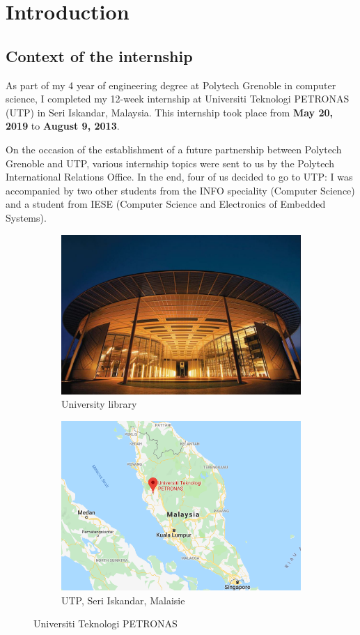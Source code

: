 \chapter{Introduction}

\section{Context of the internship}

As part of my 4 year of engineering degree at Polytech Grenoble in computer science, I completed my 12-week internship at Universiti Teknologi PETRONAS (UTP) in Seri Iskandar, Malaysia. This internship took place from \textbf{May 20, 2019} to \textbf{August 9, 2013}.

On the occasion of the establishment of a future partnership between Polytech Grenoble and UTP, various internship topics were sent to us by the Polytech International Relations Office. In the end, four of us decided to go to UTP: I was accompanied by two other students from the INFO speciality (Computer Science) and a student from IESE (Computer Science and Electronics of Embedded Systems).


\begin{figure}[h]
  \centering
  \begin{subfigure}{.5\textwidth}
    \centering
    \includegraphics[width=.8\linewidth]{content/imgs/utp.jpg}
    \caption{University library}
  \end{subfigure}%
  \begin{subfigure}{.5\textwidth}
    \centering
    \includegraphics[width=.8\linewidth]{content/imgs/map.png}
    \caption{UTP, Seri Iskandar, Malaisie}
  \end{subfigure}
  \caption{Universiti Teknologi PETRONAS}
\end{figure}




